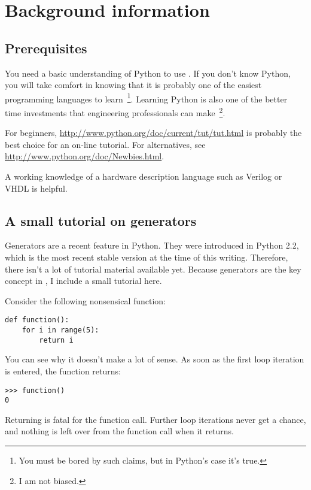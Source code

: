 \chapter{Background information}

\section{Prerequisites}

You need a basic understanding of Python to use \myhdl{}.
If you don't know Python, you will take comfort in knowing
that it is probably one of the easiest programming languages to
learn~\footnote{You must be bored by such claims, but in Python's
case it's true.}. Learning Python is also one of the better time
investments that engineering professionals can make~\footnote{I am not
biased.}.

For beginners, \url{http://www.python.org/doc/current/tut/tut.html} is
probably the best choice for an on-line tutorial. For alternatives,
see \url{http://www.python.org/doc/Newbies.html}.

A working knowledge of a hardware description language such as Verilog
or VHDL is helpful. 

\section{A small tutorial on generators}

Generators are a recent feature in Python. They were introduced in
Python 2.2, which is the most recent stable version at the time of
this writing. Therefore, there isn't a lot of tutorial material
available yet. Because generators are the key concept in
\myhdl{}, I include a small tutorial here.

Consider the following nonsensical function:

\begin{verbatim}
def function():
    for i in range(5):
        return i

\end{verbatim}

You can see why it doesn't make a lot of sense. As soon as the first
loop iteration is entered, the function returns:

\begin{verbatim}
>>> function()
0
\end{verbatim}

Returning is fatal for the function call. Further loop iterations
never get a chance, and nothing is left over from the function call
when it returns.

